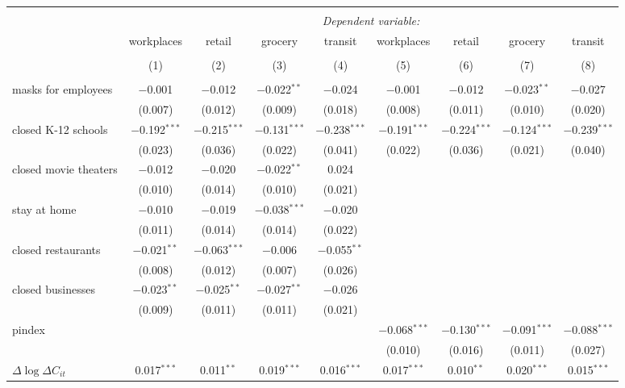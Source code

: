 \begin{tabular}{@{\extracolsep{1pt}}lcccccccc} 
\\[-1.8ex]\hline 
\hline \\[-1.8ex] 
 & \multicolumn{8}{c}{\textit{Dependent variable:}} \\ 
\cline{2-9} 
 & workplaces & retail & grocery & transit & workplaces & retail & grocery & transit \\ 
\\[-1.8ex] & (1) & (2) & (3) & (4) & (5) & (6) & (7) & (8)\\ 
\hline \\[-1.8ex] 
 masks for employees & $-$0.001 & $-$0.012 & $-$0.022$^{**}$ & $-$0.024 & $-$0.001 & $-$0.012 & $-$0.023$^{**}$ & $-$0.027 \\ 
  & (0.007) & (0.012) & (0.009) & (0.018) & (0.008) & (0.011) & (0.010) & (0.020) \\ 
  closed K-12 schools & $-$0.192$^{***}$ & $-$0.215$^{***}$ & $-$0.131$^{***}$ & $-$0.238$^{***}$ & $-$0.191$^{***}$ & $-$0.224$^{***}$ & $-$0.124$^{***}$ & $-$0.239$^{***}$ \\ 
  & (0.023) & (0.036) & (0.022) & (0.041) & (0.022) & (0.036) & (0.021) & (0.040) \\ 
  closed movie theaters & $-$0.012 & $-$0.020 & $-$0.022$^{**}$ & 0.024 &  &  &  &  \\ 
  & (0.010) & (0.014) & (0.010) & (0.021) &  &  &  &  \\ 
  stay at home & $-$0.010 & $-$0.019 & $-$0.038$^{***}$ & $-$0.020 &  &  &  &  \\ 
  & (0.011) & (0.014) & (0.014) & (0.022) &  &  &  &  \\ 
  closed restaurants & $-$0.021$^{**}$ & $-$0.063$^{***}$ & $-$0.006 & $-$0.055$^{**}$ &  &  &  &  \\ 
  & (0.008) & (0.012) & (0.007) & (0.026) &  &  &  &  \\ 
  closed businesses & $-$0.023$^{**}$ & $-$0.025$^{**}$ & $-$0.027$^{**}$ & $-$0.026 &  &  &  &  \\ 
  & (0.009) & (0.011) & (0.011) & (0.021) &  &  &  &  \\ 
  pindex &  &  &  &  & $-$0.068$^{***}$ & $-$0.130$^{***}$ & $-$0.091$^{***}$ & $-$0.088$^{***}$ \\ 
  &  &  &  &  & (0.010) & (0.016) & (0.011) & (0.027) \\ 
  $\Delta \log \Delta C_{it}$ & 0.017$^{***}$ & 0.011$^{**}$ & 0.019$^{***}$ & 0.016$^{***}$ & 0.017$^{***}$ & 0.010$^{**}$ & 0.020$^{***}$ & 0.015$^{***}$ \\ 

\end{tabular}

